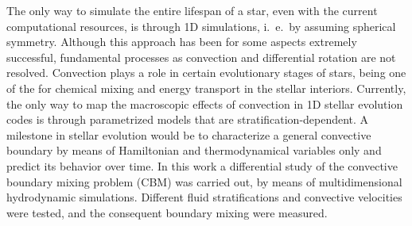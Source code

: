 The only way to simulate the entire lifespan of a star, even with the current computational resources, is through 1D simulations, i.\ e.\ by assuming spherical symmetry. Although this approach has been for some aspects extremely successful, fundamental processes as convection and differential rotation are not resolved. Convection plays a  role in certain evolutionary stages of stars, being one of the  for chemical mixing and energy transport in the stellar interiors. Currently, the only way to map the macroscopic effects of convection in 1D stellar evolution codes is through parametrized models that are stratification-dependent. A milestone in stellar evolution would be to characterize a general convective boundary by means of Hamiltonian and thermodynamical variables only and predict its behavior over time. In this work a differential study of the convective boundary mixing problem (CBM) was carried out, by means of multidimensional hydrodynamic simulations. Different fluid stratifications and convective velocities were tested, and the consequent boundary mixing were measured.

